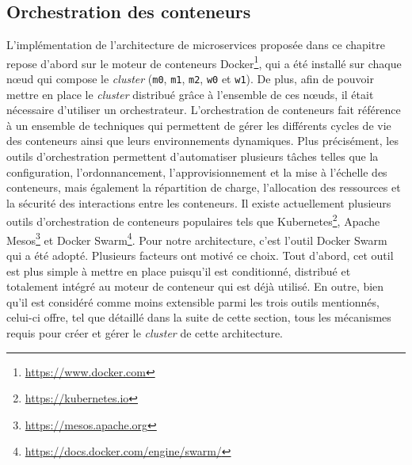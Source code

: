 \subsection{Orchestration des conteneurs}

L'implémentation de l'architecture de microservices proposée dans ce chapitre repose d'abord sur le moteur de conteneurs Docker\footnote{\url{https://www.docker.com}}, qui a été installé sur chaque n\oe{}ud qui compose le \textit{cluster} (\texttt{m0}, \texttt{m1}, \texttt{m2}, \texttt{w0} et \texttt{w1}). De plus, afin de pouvoir mettre en place le \textit{cluster} distribué grâce à l'ensemble de ces n\oe{}uds, il était nécessaire d'utiliser un orchestrateur. L'orchestration de conteneurs fait référence à un ensemble de techniques qui permettent de gérer les différents cycles de vie des conteneurs ainsi que leurs environnements dynamiques. Plus précisément, les outils d'orchestration permettent d'automatiser plusieurs tâches telles que la configuration, l'ordonnancement, l'approvisionnement et la mise à l'échelle des conteneurs, mais également la répartition de charge, l'allocation des ressources et la sécurité des interactions entre les conteneurs. Il existe actuellement plusieurs outils d'orchestration de conteneurs populaires tels que Kubernetes\footnote{\url{https://kubernetes.io}}, Apache Mesos\footnote{\url{https://mesos.apache.org}} et Docker Swarm\footnote{\url{https://docs.docker.com/engine/swarm/}}. Pour notre architecture, c'est l'outil Docker Swarm qui a été adopté. Plusieurs facteurs ont motivé ce choix. Tout d'abord, cet outil est plus simple à mettre en place puisqu'il est conditionné, distribué et totalement intégré au moteur de conteneur qui est déjà utilisé. En outre, bien qu'il est considéré comme moins extensible parmi les trois outils mentionnés, celui-ci offre, tel que détaillé dans la suite de cette section, tous les mécanismes requis pour créer et gérer le \textit{cluster} de cette architecture.


